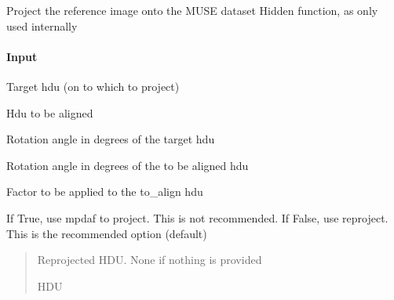 \documentclass[letterpaper,10pt,english]{sphinxmanual}
\begin{document}

\begin{fulllineitems}
\label{\detokenize{api/pymusepipe:pymusepipe.align_pipe.align_hdu}}
\pysigstartsignatures
{}
\pysigstopsignatures
\sphinxAtStartPar
Project the reference image onto the MUSE dataset
Hidden function, as only used internally


\paragraph{Input}
\label{\detokenize{api/pymusepipe:id32}}\begin{description}
\sphinxAtStartPar
Target hdu (on to which to project)

\sphinxAtStartPar
Hdu to be aligned

\sphinxAtStartPar
Rotation angle in degrees of the target hdu

\sphinxAtStartPar
Rotation angle in degrees of the to be aligned hdu

\sphinxAtStartPar
Factor to be applied to the to\_align hdu

\sphinxAtStartPar
If True, use mpdaf to project. This is not recommended.
If False, use reproject. This is the recommended option (default)

\end{description}
\begin{quote}\begin{description}
\sphinxAtStartPar
{} \textendash{} Reprojected HDU. None if nothing is provided

\sphinxAtStartPar
HDU

\end{description}\end{quote}

\end{fulllineitems}
\end{document}
